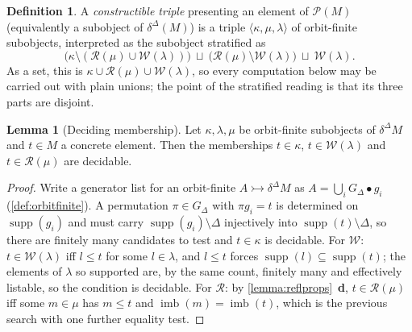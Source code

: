 \documentclass{article}
\theoremstyle{definition}
\newtheorem{definition}{Definition}[section]
\newtheorem{lemma}{Lemma}[section]
\newcommand{\cP}{\mathcal{P}}
\newcommand{\cR}{\mathcal{R}}
\newcommand{\cW}{\mathcal{W}}
\newcommand{\supp}{\operatorname{supp}}
\newcommand{\imb}{\operatorname{imb}}
\begin{document}
\begin{definition}
    \label{def:constructibletriple}
    A {\it constructible triple} presenting an element of $\cP(M)$ (equivalently a subobject of $\delta^\Delta(M)$) is a triple $\langle\kappa,\mu,\lambda\rangle$ of orbit-finite subobjects, interpreted as the subobject stratified as
    $$\bigl(\kappa\setminus(\cR(\mu)\cup\cW(\lambda))\bigr)\ \sqcup\ \bigl(\cR(\mu)\setminus\cW(\lambda)\bigr)\ \sqcup\ \cW(\lambda).$$
    As a set, this is $\kappa\cup\cR(\mu)\cup\cW(\lambda)$, so every computation below may be carried out with plain unions; the point of the stratified reading is that its three parts are disjoint. 
\end{definition}

\begin{lemma}[Deciding membership]
    \label{lemma:matching}
    Let $\kappa,\lambda,\mu$ be orbit-finite subobjects of $\delta^\Delta M$ and $t\in M$ a concrete element. 
    Then the memberships $t\in\kappa$, $t\in\cW(\lambda)$ and $t\in\cR(\mu)$ are decidable.
\end{lemma}
\begin{proof}
    Write a generator list for an orbit-finite $A\rightarrowtail\delta^\Delta M$ as $A=\bigcup_iG_\Delta\bullet g_i$ (\cref{def:orbitfinite}). 
    A permutation $\pi\in G_\Delta$ with $\pi g_i=t$ is determined on $\supp(g_i)$ and must carry $\supp(g_i)\setminus\Delta$ injectively into $\supp(t)\setminus\Delta$, so there are finitely many candidates to test and $t\in\kappa$ is decidable. 
    For $\cW$: $t\in\cW(\lambda)$ iff $l\leq t$ for some $l\in\lambda$, and $l\leq t$ forces $\supp(l)\subseteq\supp(t)$; 
    the elements of $\lambda$ so supported are, by the same count, finitely many and effectively listable, so the condition is decidable. 
    For $\cR$: by \cref{lemma:reflprops}~{\bf d}, $t\in\cR(\mu)$ iff some $m\in\mu$ has $m\leq t$ and $\imb(m)=\imb(t)$, which is the previous search with one further equality test.
\end{proof}
\end{document}
